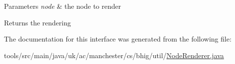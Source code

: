 \begin{DoxyParams}{Parameters}
{\em node} & the node to render \\
\hline
\end{DoxyParams}
\begin{DoxyReturn}{Returns}
the rendering 
\end{DoxyReturn}


The documentation for this interface was generated from the following file\-:\begin{DoxyCompactItemize}
\item 
tools/src/main/java/uk/ac/manchester/cs/bhig/util/\hyperlink{_node_renderer_8java}{Node\-Renderer.\-java}\end{DoxyCompactItemize}
